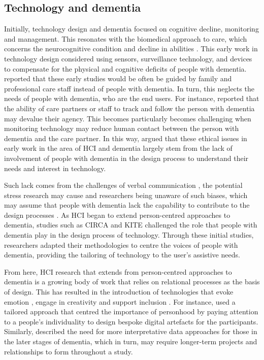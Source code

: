\subsection{Technology and dementia}
\label{Context:Design}
Initially, technology design and dementia focused on cognitive decline, monitoring and management. This resonates with the biomedical approach to care, which concerns the neurocognitive condition and decline in abilities \citep{o2022conceptualizing}. This early work in technology design considered using sensors, surveillance technology, and devices to compensate for the physical and cognitive deficits of people with dementia. \cite{bharucha2009intelligent} reported that these early studies would be often be guided by family and professional care staff instead of people with dementia. In turn, this neglects the needs of people with dementia, who are the end users. For instance, \cite{astell2006technology} reported that the ability of care partners or staff to track and follow the person with dementia may devalue their agency. This becomes particularly becomes challenging when monitoring technology may reduce human contact between the person with dementia and the care partner. In this way, \cite{astell2006technology} argued that these ethical issues in early work in the area of HCI and dementia largely stem from the lack of involvement of people with dementia in the design process to understand their needs and interest in technology.

Such lack comes from the challenges of verbal communication \citep{majlesi2017video}, the potential stress research may cause and researchers being unaware of such biases, which may assume that people with dementia lack the capability to contribute to the design processes \citep{manthorpe_person-centered_2016}. As HCI began to extend person-centred approaches to dementia, studies such as CIRCA \citep{astell_stimulating_2010} and KITE \citep{robinson2009keeping} challenged the role that people with dementia play in the design process of technology. Through these initial studies, researchers adapted their methodologies to centre the voices of people with dementia, providing the tailoring of technology to the user's assistive needs. 

From here, HCI research that extends from person-centred approaches to dementia is a growing body of work that relies on relational processes as the basis of design. This has resulted in the introduction of technologies that evoke emotion \citep{wallace_enabling_2012-1,houben_foregrounding_2019,dixon_approach_2020}, engage in creativity \citep{lindsay_empathy_2012,morrissey_im_2016} and support inclusion \citep{welsh_ticket_2018,foley_printer_2019,treadaway_sensor_2016}. For instance, \cite{wallace_design-led_2013} used a tailored approach that centred the importance of personhood by paying attention to a people’s individuality to design bespoke digital artefacts for the participants. Similarly, \cite{lindsay_empathy_2012} described the need for more interpretative data approaches for those in the later stages of dementia, which in turn, may require longer-term projects and relationships to form throughout a study. 

